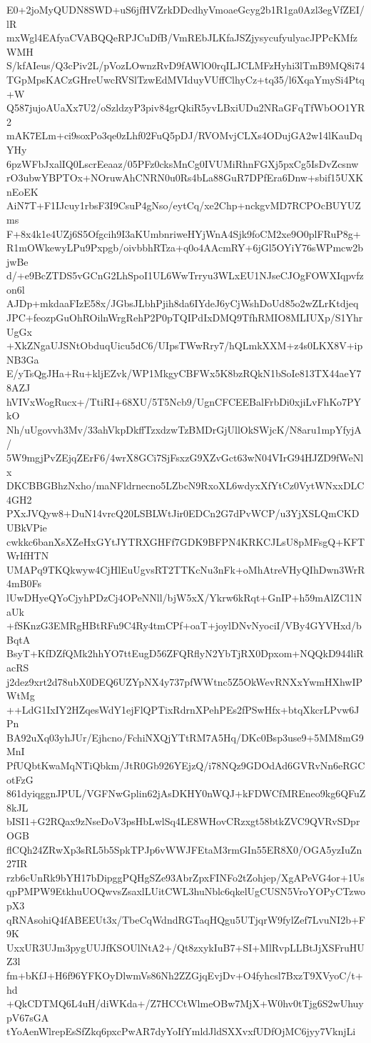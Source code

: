 E0+2joMyQUDN8SWD+uS6jfHVZrkDDcdhyVmoaeGcyg2b1R1ga0Azl3egVfZEI/lR
mxWgl4EAfyaCVABQQeRPJCuDfB/VmREbJLKfaJSZjysycufyulyacJPPcKMfzWMH
S/kfAIeus/Q3cPiv2L/pVozLOwnzRvD9fAWlO0rqILJCLMFzHyhi3lTmB9MQ8i74
TGpMpsKACzGHreUwcRVSlTzwEdMVIduyVUffClhyCz+tq35/l6XqaYmySi4Ptq+W
Q587jujoAUaXx7U2/oSzldzyP3piv84grQkiR5yvLBxiUDu2NRaGFqTfWbOO1YR2
mAK7ELm+ci9soxPo3qe0zLhf02FuQ5pDJ/RVOMvjCLXs4ODujGA2w14lKauDqYHy
6pzWFbJxalIQ0LscrEeaaz/05PFz0cksMnCg0IVUMiRhnFGXj5pxCg5IsDvZcsnw
rO3ubwYBPTOx+NOruwAhCNRN0u0Rs4bLa88GuR7DPfEra6Dnw+sbif15UXKnEoEK
AiN7T+F1IJcuy1rbsF3I9CsuP4gNso/eytCq/xe2Chp+nckgvMD7RCPOcBUYUZms
F+8x4k1e4UZj6S5Ofgcih9I3aKUmbnriweHYjWnA4Sjk9foCM2xe9O0plFRuP8g+
R1mOWkewyLPu9Pxpgb/oivbbhRTza+q0o4AAcmRY+6jGl5OYiY76sWPmcw2bjwBe
d/+e9BcZTDS5vGCnG2LhSpoI1UL6WwTrryu3WLxEU1NJseCJOgFOWXIqpvfzon6l
AJDp+mkdaaFIzE58x/JGbsJLbhPjih8da6IYdeJ6yCjWshDoUd85o2wZLrKtdjeq
JPC+feozpGuOhROilnWrgRehP2P0pTQIPdIxDMQ9TfhRMIO8MLIUXp/S1YhrUgGx
+XkZNgaUJSNtObduqUicu5dC6/UIpsTWwRry7/hQLmkXXM+z4s0LKX8V+ipNB3Ga
E/yTsQgJHa+Ru+kljEZvk/WP1MkgyCBFWx5K8bzRQkN1bSoIe813TX44aeY78AZJ
hVIVxWogRucx+/TtiRI+68XU/5T5Ncb9/UgnCFCEEBalFrbDi0xjiLvFhKo7PYkO
Nh/uUgovvh3Mv/33ahVkpDkffTzxdzwTzBMDrGjUllOkSWjcK/N8aru1mpYfyjA/
5W9mgjPvZEjqZErF6/4wrX8GCi7SjFsxzG9XZvGct63wN04VIrG94HJZD9fWeNlx
DKCBBGBhzNxho/maNFldrnecno5LZbcN9RxoXL6wdyxXfYtCz0VytWNxxDLC4GH2
PXxJVQyw8+DuN14vrcQ20LSBLWtJir0EDCn2G7dPvWCP/u3YjXSLQmCKDUBkVPie
cwkkc6banXsXZeHxGYtJYTRXGHFf7GDK9BFPN4KRKCJLsU8pMFsgQ+KFTWrIfHTN
UMAPq9TKQkwyw4CjHlEuUgvsRT2TTKcNu3nFk+oMhAtreVHyQIhDwn3WrR4mB0Fs
lUwDHyeQYoCjyhPDzCj4OPeNNll/bjW5xX/Ykrw6kRqt+GnIP+h59mAlZCl1NaUk
+fSKnzG3EMRgHBtRFu9C4Ry4tmCPf+oaT+joylDNvNyociI/VBy4GYVHxd/bBqtA
BsyT+KfDZfQMk2hhYO7ttEugD56ZFQRflyN2YbTjRX0Dpxom+NQQkD944liRacRS
j2dez9xrt2d78ubX0DEQ6UZYpNX4y737pfWWtnc5Z5OkWevRNXxYwmHXhwIPWtMg
++LdG1IxIY2HZqesWdY1ejFlQPTixRdrnXPehPEs2fPSwHfx+btqXkcrLPvw6JPn
BA92uXq03yhJUr/Ejhcno/FchiNXQjYTtRM7A5Hq/DKc0Bsp3use9+5MM8mG9MnI
PfUQbtKwaMqNTiQbkm/JtR0Gb926YEjzQ/i78NQz9GDOdAd6GVRvNn6eRGCotFzG
861dyiqggnJPUL/VGFNwGplin62jAsDKHY0nWQJ+kFDWCfMREneo9kg6QFuZ8kJL
bISI1+G2RQax9zNseDoV3psHbLwlSq4LE8WHovCRzxgt58btkZVC9QVRvSDprOGB
flCQh24ZRwXp3sRL5b5SpkTPJp6vWWJFEtaM3rmGIn55ER8X0/OGA5yzIuZn27IR
rzb6cUnRk9bYH17bDipggPQHgSZe93AbrZpxFINFo2tZohjep/XgAPeVG4or+1Us
qpPMPW9EtkhuUOQwvsZsaxlLUitCWL3huNblc6qkelUgCUSN5VroYOPyCTzwopX3
qRNAsohiQ4fABEEUt3x/TbeCqWdndRGTaqHQgu5UTjqrW9fylZef7LvuNI2b+F9K
UxxUR3UJm3pygUUJfKSOUlNtA2+/Qt8zxykIuB7+SI+MlRvpLLBtJjXSFruHUZ3l
fm+bKfJ+H6f96YFKOyDlwmVs86Nh2ZZGjqEvjDv+O4fyhcsl7BxzT9XVyoC/t+hd
+QkCDTMQ6L4uH/diWKda+/Z7HCCtWlmeOBw7MjX+W0hv0tTjg6S2wUhuypV67sGA
tYoAenWlrepEsSfZkq6pxcPwAR7dyYoIfYmldJldSXXvxfUDfOjMC6jyy7VknjLi
